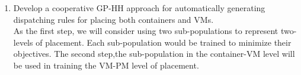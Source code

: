 \begin{enumerate}


	\item Develop a cooperative GP-HH approach for automatically generating dispatching rules for placing both containers and VMs. \\
	As the first step, we will consider using two sub-populations to represent two-levels of placement. Each sub-population would be trained to minimize their objectives. The second step,the sub-population in the container-VM level will be used in training the VM-PM level of placement. 



	\end{enumerate}


